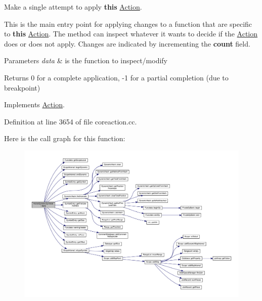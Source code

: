 Make a single attempt to apply {\bfseries{this}} \mbox{\hyperlink{class_action}{Action}}. 

This is the main entry point for applying changes to a function that are specific to {\bfseries{this}} \mbox{\hyperlink{class_action}{Action}}. The method can inspect whatever it wants to decide if the \mbox{\hyperlink{class_action}{Action}} does or does not apply. Changes are indicated by incrementing the {\bfseries{count}} field. 
\begin{DoxyParams}{Parameters}
{\em data} & is the function to inspect/modify \\
\hline
\end{DoxyParams}
\begin{DoxyReturn}{Returns}
0 for a complete application, -\/1 for a partial completion (due to breakpoint) 
\end{DoxyReturn}


Implements \mbox{\hyperlink{class_action_aac1c3999d6c685b15f5d9765a4d04173}{Action}}.



Definition at line 3654 of file coreaction.\+cc.

Here is the call graph for this function\+:
\nopagebreak
\begin{figure}[H]
\begin{center}
\leavevmode
\includegraphics[width=350pt]{class_action_dynamic_symbols_aa3c25f3a649481cc9c783609295b60b8_cgraph}
\end{center}
\end{figure}
\mbox{\label{class_action_dynamic_symbols_aff1299c36f20a83a2efd54768e58abeb}} 
